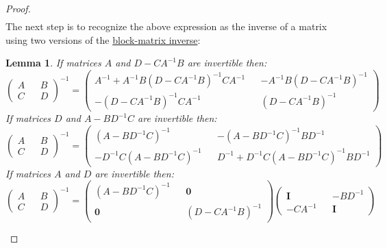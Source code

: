 \documentclass[10pt,fleqn]{amsart}
\newtheorem{lemma}[theorem]{Lemma}
\theoremstyle{definition}
\theoremstyle{remark}
\numberwithin{equation}{section}
\begin{document}
\begin{proof}
\begin{equation}
\begin{split}
\end{split}\end{equation}
The next step is to recognize the above expression as the inverse of a matrix using two versions of the \href{https://en.wikipedia.org/wiki/Block_matrix}{block-matrix inverse}:
\begin{lemma}
    If matrices $A$ and $D-CA^{-1}B$ are invertible then:
    \begin{equation}\label{appendix_gauss_conv_eq2}
        \left(\begin{matrix}A&&B\\C&&D\end{matrix}\right)^{-1}=
        \left(\begin{matrix}
        A^{-1}+A^{-1}B\left(D-CA^{-1}B\right)^{-1}CA^{-1}&&-A^{-1}B\left(D-CA^{-1}B\right)^{-1}\\
        -\left(D-CA^{-1}B\right)^{-1}CA^{-1}&&\left(D-CA^{-1}B\right)^{-1}
        \end{matrix}\right)
    \end{equation}
    If matrices $D$ and $A-BD^{-1}C$ are invertible then:
    \begin{equation}
        \left(\begin{matrix}A&&B\\C&&D\end{matrix}\right)^{-1}=
        \left(\begin{matrix}
        \left(A-BD^{-1}C\right)^{-1}&&-\left(A-BD^{-1}C\right)^{-1}BD^{-1}\\
        -D^{-1}C\left(A-BD^{-1}C\right)^{-1}&&D^{-1}+D^{-1}C\left(A-BD^{-1}C\right)^{-1}BD^{-1}
        \end{matrix}\right)
    \end{equation}
    If matrices $A$ and $D$ are invertible then:
    \begin{equation}
        \left(\begin{matrix}A&&B\\C&&D\end{matrix}\right)^{-1}=
        \left(\begin{matrix}\left(A-BD^{-1}C\right)^{-1}&&\boldsymbol{0}\\\boldsymbol{0}&&\left(D-CA^{-1}B\right)^{-1}\end{matrix}\right)
        \left(\begin{matrix}\boldsymbol{I}&&-BD^{-1}\\-CA^{-1}&&\boldsymbol{I}\end{matrix}\right)
    \end{equation}

\end{lemma}
\end{proof}
\end{document}

